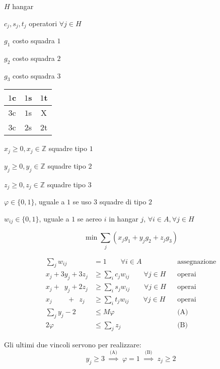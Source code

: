 $H$ hangar

$c_{j},s_{j},t_{j}$ operatori $\forall j\in H$

$g_{1}$ costo squadra $1$

$g_{2}$ costo squadra $2$

$g_{3}$ costo squadra $3$

\begin{center}
	
	\begin{tabular}{|c|c|c|}
		\hline 
		$1$c & $1$s & $1$t \\
		\hline 
		$3$c & $1$s & X    \\
		\hline 
		$3$c & $2$s & $2$t \\
		\hline
	\end{tabular}
\end{center}

\Var

$x_{j} \geq 0,x_{j} \in \mathbb{Z}$ squadre tipo $1$

$y_{j} \geq 0,y_{j} \in \mathbb{Z}$ squadre tipo $2$

$z_{j} \geq 0,z_{j} \in \mathbb{Z}$ squadre tipo $3$

$\varphi \in \{0,1\}$, uguale a $1$ se uso 3 squadre di tipo $2$

$w_{ij} \in \{0,1\}$, uguale a $1$ se aereo $i$ in hangar $j$, $\forall i\in A,\forall j\in H$

\Fob

\begin{equation*}
	\min \sum _{j}( x_{j} g_{1} +y_{j} g_{2} +z_{j} g_{3})
\end{equation*}

\Vin

\begin{align*}
	\sum _{j} w_{ij} &=1\qquad\forall i\in A&&\text{assegnazione}\\
	x_{j} +3y_{j} +3z_{j} &\geq \sum _{i} c_{j} w_{ij} \qquad\forall j\in H &&\text{operai}\\
	x_{j} +\phantom{3}y_{j}  +2z_{j} &\geq \sum _{i} s_{j} w_{ij} \qquad\forall j\in H &&\text{operai}\\
	x_{j} \phantom{+3y_{j}}  +\phantom{2}z_{j}  &\geq \sum _{i} t_{j} w_{ij} \qquad\forall j\in H &&\text{operai}\\
	\sum _{j} y_{j} -2&\leq M\varphi &&\text{(A)}\\
	2\varphi &\leq \sum _{j} z_{j}&&\text{(B)}
\end{align*}

Gli ultimi due vincoli servono per realizzare:
\begin{equation*}
	y_{j} \geq 3\ \ \overset{\text{(A)}}{\Rightarrow } \ \ \varphi =1\ \ \overset{\text{(B)}}{\Rightarrow } \ \ z_{j} \geq 2
\end{equation*}

